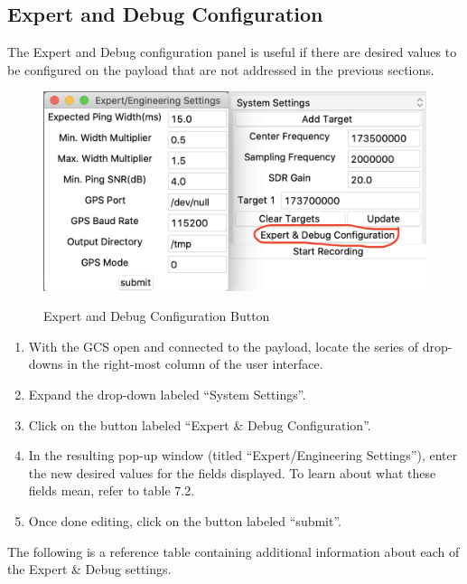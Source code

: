 \documentclass{report}
\begin{document}
		\subsection{Expert and Debug Configuration}
			The Expert and Debug configuration panel is useful if there are desired values to be configured on the payload that are not addressed in the previous sections.
			\begin{figure}[htb]
				\centering
				\caption{Expert and Debug Configuration Button}
				\includegraphics[scale=0.5]{expert_debug.jpg}
				\label{fig:expert_debug}
			\end{figure}
			\begin{enumerate}
				\item With the GCS open and connected to the payload, locate the series of drop-downs in the right-most column of the user interface.
				\item Expand the drop-down labeled ``System Settings''.
				\item Click on the button labeled ``Expert \& Debug Configuration''.
				\item In the resulting pop-up window (titled ``Expert/Engineering Settings''), enter the new desired values for the fields displayed. To learn about what these fields mean, refer to table 7.2.
				\item Once done editing, click on the button labeled ``submit''.
			\end{enumerate}
			The following is a reference table containing additional information about each of the Expert \& Debug settings.
\end{document}
